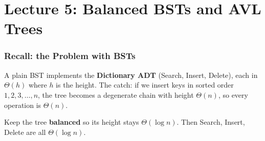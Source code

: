 \documentclass[11pt]{article}
\begin{document}
\vspace{4pt}

%
%
%
%

\newpage


\part*{\textcolor{utnavy}{Lecture 5: Balanced BSTs and AVL Trees}}
\setcounter{section}{0}

\section{Recall: the Problem with BSTs}

A plain BST implements the \textbf{Dictionary ADT} (Search, Insert, Delete), each in \textcolor{greenO}{$\Theta(h)$} where $h$ is the height. The catch: if we insert keys in sorted order $1, 2, 3, \ldots, n$, the tree becomes a \textcolor{rustW}{degenerate chain} with height $\Theta(n)$, so every operation is $\Theta(n)$.

\begin{keybox}[Goal]
Keep the tree \textbf{balanced} so its height stays \textcolor{greenO}{$\Theta(\log n)$}. Then Search, Insert, Delete are all \textcolor{greenO}{$\Theta(\log n)$}.
\end{keybox}
\end{document}
